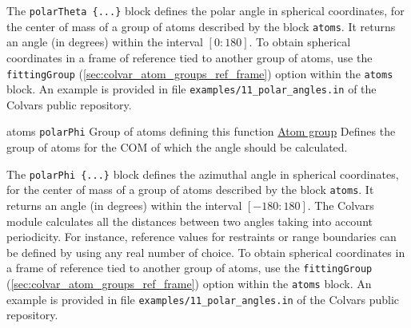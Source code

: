 \begin{cvcoptions}
\item %
\item %
\item %
\item %
\item %
\end{cvcoptions}



The \texttt{polarTheta~\{...\}} block defines the polar angle in
spherical coordinates, for the center of mass of a group of atoms
described by the block \texttt{atoms}.  It returns an angle
(in degrees) within the interval $[0:180]$.
To obtain spherical coordinates in a frame of reference tied to
another group of atoms, use the \texttt{fittingGroup} (\ref{sec:colvar_atom_groups_ref_frame}) option
within the \texttt{atoms} block.
An example is provided in file \texttt{examples/11\_polar\_angles.in} of the Colvars public repository.

\begin{cvcoptions}
\item %
  \key
    {atoms}{%
    \texttt{polarPhi}}{%
    Group of atoms defining this function}{%
    \hyperref[sec:colvar_atom_groups]{Atom group}}{%
    Defines the group of atoms for the COM of which the angle should be calculated.
    }
\end{cvcoptions}



The \texttt{polarPhi~\{...\}} block defines the azimuthal angle in
spherical coordinates, for the center of mass of a group of atoms
described by the block \texttt{atoms}. It returns an angle
(in degrees) within the interval $[-180:180]$.  The Colvars module
calculates all the distances between two angles taking into account
periodicity.  For instance, reference values for restraints or range
boundaries can be defined by using any real number of choice.
To obtain spherical coordinates in a frame of reference tied to
another group of atoms, use the \texttt{fittingGroup} (\ref{sec:colvar_atom_groups_ref_frame}) option
within the \texttt{atoms} block.
An example is provided in file \texttt{examples/11\_polar\_angles.in} of the Colvars public repository.


